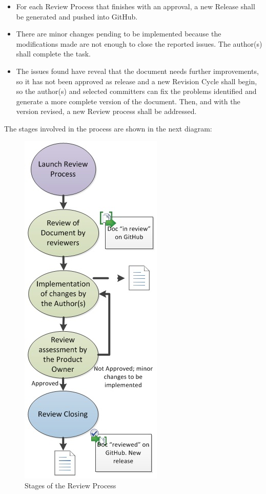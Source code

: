 \documentclass{template/openetcs_article}
\begin{document}
\begin{itemize}
\item For each Review Process that finishes with an approval, a new Release shall be generated and pushed into GitHub.
\item There are minor changes pending to be implemented because the modifications made are not enough to close the reported issues. The author(s) shall complete the task.
\item The issues found have reveal that the document needs further improvements, so it has not been approved as release and a new Revision Cycle shall begin, so the author(s) and selected committers can fix the problems identified and generate a more complete version of the document. Then, and with the version revised, a new Review process shall be addressed. 
\end{itemize}

The stages involved in the process are shown in the next diagram:

\begin{figure}[H]
\centering
\includegraphics{./figures/ReviewProcess.JPG}
\caption{Stages of the Review Process}
\end{figure}
\end{document}
